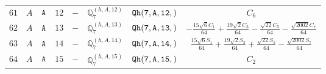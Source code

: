 \documentclass[fleqn,8pt]{jsarticle}
\begin{document}
\begin{table}[ht!]
\begin{center}
\begin{tabular}{cccccccc}
$ 61 $ & $ A $ & $ {\tt A} $ & $ 12 $ & $ - $ & $ \mathbb{Q}_{7}^{(h,A,12)} $ & $ {\tt Qh(7,A,12,)} $ & $ C_{6} $ \\
$ 62 $ & $ A $ & $ {\tt A} $ & $ 13 $ & $ - $ & $ \mathbb{Q}_{7}^{(h,A,13)} $ & $ {\tt Qh(7,A,13,)} $ & $ - \frac{15 \sqrt{6} C_{1}}{64} + \frac{19 \sqrt{2} C_{3}}{64} - \frac{\sqrt{22} C_{5}}{64} - \frac{\sqrt{2002} C_{7}}{64} $ \\
$ 63 $ & $ A $ & $ {\tt A} $ & $ 14 $ & $ - $ & $ \mathbb{Q}_{7}^{(h,A,14)} $ & $ {\tt Qh(7,A,14,)} $ & $ \frac{15 \sqrt{6} S_{1}}{64} + \frac{19 \sqrt{2} S_{3}}{64} + \frac{\sqrt{22} S_{5}}{64} - \frac{\sqrt{2002} S_{7}}{64} $ \\
$ 64 $ & $ A $ & $ {\tt A} $ & $ 15 $ & $ - $ & $ \mathbb{Q}_{7}^{(h,A,15)} $ & $ {\tt Qh(7,A,15,)} $ & $ C_{2} $ \\
 \hline \hline
\end{tabular}
\end{center}
\end{table}
\end{document}
